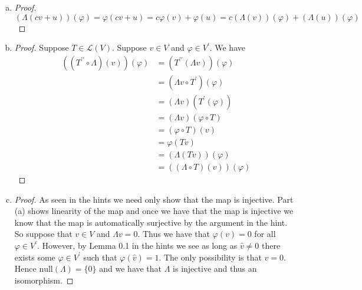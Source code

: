 \documentclass[12pt,letterpaper]{article}
\theoremstyle{plain}
\theoremstyle{definition}
\begin{document}
\vspace{.15in}
\begin{enumerate}[(a)]
\item \begin{proof} 
\[(\Lambda(cv+u))(\varphi)=\varphi(cv+u)=c\varphi(v)+\varphi(u)=c(\Lambda(v))(\varphi)+(\Lambda (u))(\varphi)\]
         \end{proof}
\item \begin{proof}
Suppose $T\in \mathcal{L}(V)$. Suppose $v\in V$ and $\varphi\in V^\prime$. We have 
\begin{align*}
((T^{\prime\prime}\circ \Lambda)(v))(\varphi)&=(T^{\prime\prime}(\Lambda v))(\varphi)\\
&=(\Lambda v\circ T^\prime)(\varphi)\\
&=(\Lambda v)(T^\prime(\varphi))\\
& = (\Lambda v)(\varphi \circ T)\\
& = (\varphi \circ T)(v)\\
& =\varphi(Tv)\\
&=(\Lambda(Tv))(\varphi)\\
&=((\Lambda\circ T)(v))(\varphi)
\end{align*}
	\end{proof}
\item \begin{proof} As seen in the hints we need only show that the map is injective. Part (a) shows linearity of the map and once we have that the map is injective we know that the map is automatically surjective by the argument in the hint. So suppose that $v\in V$ and $\Lambda v=0$. Thus we have that $\varphi(v)=0$ for all $\varphi \in V^\prime$. However, by Lemma 0.1 in the hints we see as long as $\hat{v}\neq 0$ there exists some $\varphi \in V^\prime$ such that $\varphi(\hat{v})=1$. The only possibility is that $v=0$. Hence $\text{null}(\Lambda)=\{0\}$ and we have that $\Lambda$ is injective and thus an isomorphism. 

	\end{proof}
\end{enumerate}
\end{document}
